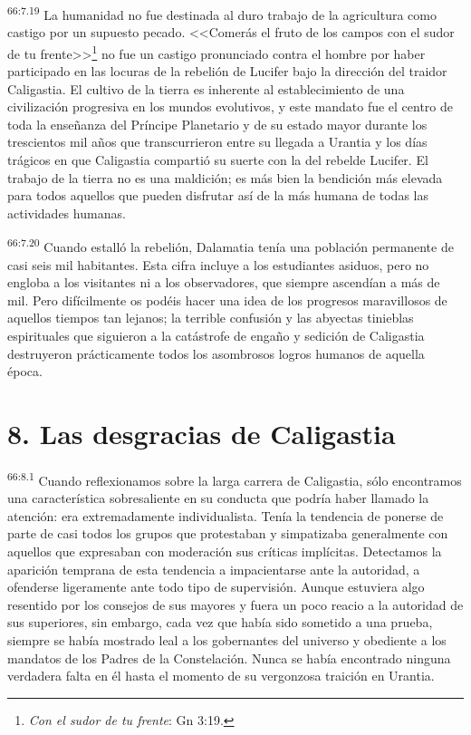 \par
\textsuperscript{66:7.19} La humanidad no fue destinada al duro trabajo de la agricultura como castigo por un supuesto pecado. <<Comerás el fruto de los campos con el sudor de tu frente>>\footnote{\textit{Con el sudor de tu frente}: Gn 3:19.} no fue un castigo pronunciado contra el hombre por haber participado en las locuras de la rebelión de Lucifer bajo la dirección del traidor Caligastia. El cultivo de la tierra es inherente al establecimiento de una civilización progresiva en los mundos evolutivos, y este mandato fue el centro de toda la enseñanza del Príncipe Planetario y de su estado mayor durante los trescientos mil años que transcurrieron entre su llegada a Urantia y los días trágicos en que Caligastia compartió su suerte con la del rebelde Lucifer. El trabajo de la tierra no es una maldición; es más bien la bendición más elevada para todos aquellos que pueden disfrutar así de la más humana de todas las actividades humanas.

\par
\textsuperscript{66:7.20} Cuando estalló la rebelión, Dalamatia tenía una población permanente de casi seis mil habitantes. Esta cifra incluye a los estudiantes asiduos, pero no engloba a los visitantes ni a los observadores, que siempre ascendían a más de mil. Pero difícilmente os podéis hacer una idea de los progresos maravillosos de aquellos tiempos tan lejanos; la terrible confusión y las abyectas tinieblas espirituales que siguieron a la catástrofe de engaño y sedición de Caligastia destruyeron prácticamente todos los asombrosos logros humanos de aquella época.

\section*{8. Las desgracias de Caligastia}
\par
\textsuperscript{66:8.1} Cuando reflexionamos sobre la larga carrera de Caligastia, sólo encontramos una característica sobresaliente en su conducta que podría haber llamado la atención: era extremadamente individualista. Tenía la tendencia de ponerse de parte de casi todos los grupos que protestaban y simpatizaba generalmente con aquellos que expresaban con moderación sus críticas implícitas. Detectamos la aparición temprana de esta tendencia a impacientarse ante la autoridad, a ofenderse ligeramente ante todo tipo de supervisión. Aunque estuviera algo resentido por los consejos de sus mayores y fuera un poco reacio a la autoridad de sus superiores, sin embargo, cada vez que había sido sometido a una prueba, siempre se había mostrado leal a los gobernantes del universo y obediente a los mandatos de los Padres de la Constelación. Nunca se había encontrado ninguna verdadera falta en él hasta el momento de su vergonzosa traición en Urantia.

